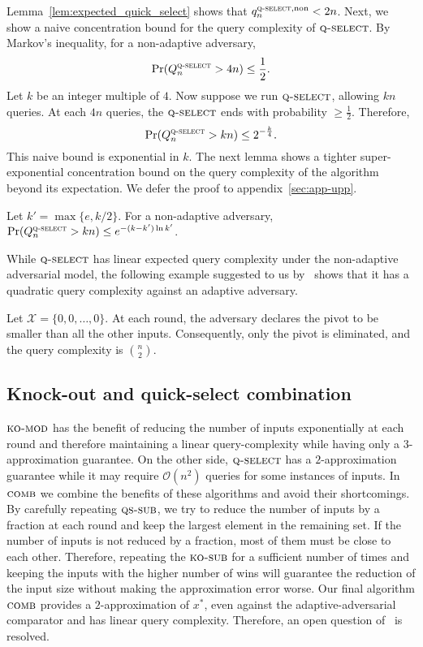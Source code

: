 \documentclass[twoside,11pt]{article}
\newcommand{\cO}{\mathcal{O}}
\newcommand{\cX}{\mathcal{X}}
\newcommand{\pr}{\text{Pr}}
\newcommand{\algorithms}[1]{\textsc{#1}}
\newcommand{\algkosub}{\algorithms{ko-sub}}
\newcommand{\algkomod}{\algorithms{ko-mod}}
\newcommand{\algqssub}{\algorithms{qs-sub}}
\newcommand{\algquickselect}{\algorithms{q-select}}
\newcommand{\algcomb}{\algorithms{comb}}
\newcommand{\maxx}{x^*}
\newcommand{\nonadaptive}{\textnormal{non}}
\begin{document}
Lemma~\ref{lem:expected_quick_select} shows that
$q_n^{\algquickselect,\nonadaptive}<2n$.  Next, we show a naive concentration bound for the query complexity of $\algquickselect$. By Markov's inequality, for a non-adaptive adversary,
\[
 \pr(Q_n^{\algquickselect}>4n)\le \frac12.
\]
Let $k$ be an integer multiple of $4$. Now suppose we run $\algquickselect$, allowing $kn$ queries. At each $4n$ queries, the $\algquickselect$ ends with probability $\ge \frac12$. Therefore,
\[
\pr(Q_n^{\algquickselect}>kn)\le 2^{-\frac{k}{4}}.
\]
This naive bound is exponential in $k$. The next lemma shows
  a tighter super-exponential concentration bound on the query complexity of the algorithm
  beyond its expectation. We defer the proof to
  appendix~\ref{sec:app-upp}.
\begin{lemma}
\label{lem:conselect}
 Let  $k'=\max\{e,k/2\}$. For a non-adaptive adversary, $\pr(Q_n^{\algquickselect}>kn)\le e^{-(k-k')\ln k'}$.
\end{lemma}

While $\algquickselect$ has linear expected query complexity under the
non-adaptive adversarial model, the following example suggested to us
by~\citet{JelaniNPC} shows that it has a quadratic query
complexity against an adaptive adversary.
\begin{example}
\label{exm:expected_quick_select}
 Let $\cX=\{0,0,\ldots, 0\}$. At each round, the adversary declares the pivot to be smaller than all the other inputs. Consequently, only the pivot is eliminated, and the query complexity is $\binom{n}{2}$. 
\end{example}

\subsection{Knock-out and quick-select combination}
\label{sec:combined}
$\algkomod$ has the benefit of reducing the
  number of inputs exponentially at each round and therefore
  maintaining a linear query-complexity while having only a
  $3$-approximation guarantee. On the other side, $\algquickselect$ has a
  $2$-approximation guarantee while it may require $\cO(n^2)$ queries
  for some instances of inputs. In $\algcomb$ we combine the benefits
  of these algorithms and avoid their shortcomings. By carefully
  repeating $\algqssub$, we try to reduce the number of inputs by a
  fraction at each round and keep the largest element in the remaining
  set. If the number of inputs is not reduced by a fraction, most of
  them must be close to each other. Therefore, repeating the
  $\algkosub$ for a sufficient number of times and 
  keeping the inputs with the higher
  number of wins will guarantee the reduction of the input size
  without making the approximation error worse.
Our final algorithm $\algcomb$ provides a $2$-approximation of $\maxx$, 
even against the adaptive-adversarial comparator and has linear query
complexity. Therefore, an open question
of~\citet{AjtaiFHN15} is resolved.
\end{document}
